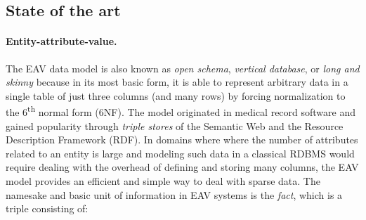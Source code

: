 \subsection{State of the art}\label{sec:sota}

\paragraph{Entity-attribute-value.}

The EAV data model is also known as \emph{open schema}, \emph{vertical database}, or \emph{long and skinny} \cite{jastrow2015entity} because in its most basic form, it is able to represent arbitrary data in a single table of just three columns (and many rows) by forcing normalization to the 6\textsuperscript{th} normal form (6NF). The model originated in medical record software \cite{huff1994help} and gained popularity through \emph{triple stores} of the Semantic Web and the Resource Description Framework (RDF). In domains where where the number of attributes related to an entity is large and modeling such data in a classical \gls{RDBMS} would require dealing with the overhead of defining and storing many columns, the EAV model provides an efficient and simple way to deal with sparse data. The namesake and basic unit of information in EAV systems is the \emph{fact}, which is a triple \lisp{[e a v]} consisting of:

